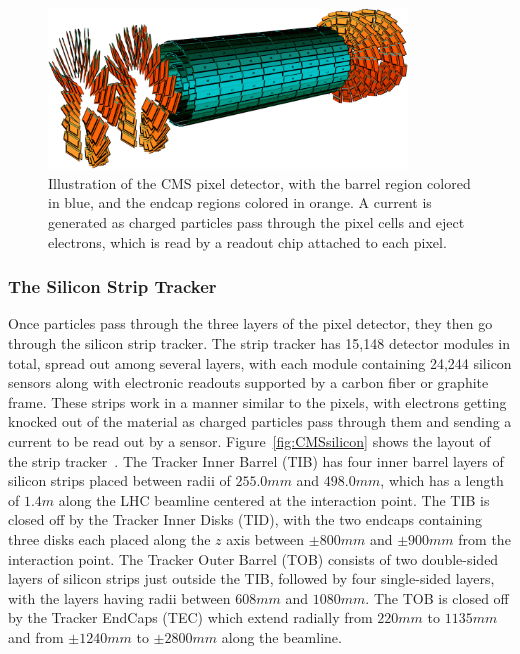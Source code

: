\begin{figure}[htbp]
  \centering
  \includegraphics[width=0.85\textwidth]{fig/experiment/cms_pixelTracker.pdf}
  \caption{
    Illustration of the CMS pixel detector, with the barrel region colored in blue, and the endcap regions colored in orange.
    A current is generated as charged particles pass through the pixel cells and eject electrons, which is read by a readout chip attached to each pixel.
  }
  \label{fig:CMSpixel}
\end{figure}

\subsubsection{The Silicon Strip Tracker}

Once particles pass through the three layers of the pixel detector, they then go through the silicon strip tracker.
The strip tracker has 15,148 detector modules in total, spread out among several layers, with each module containing 24,244 silicon sensors along with electronic readouts supported by a carbon fiber or graphite frame. %
These strips work in a manner similar to the pixels, with electrons getting knocked out of the material as charged particles pass through them and sending a current to be read out by a sensor.
Figure~\ref{fig:CMSsilicon} shows the layout of the strip tracker~\cite{Chatrchyan:1211825}.
The Tracker Inner Barrel (TIB) has four inner barrel layers of silicon strips placed between radii of $255.0\unit{mm}$ and $498.0\unit{mm}$, which has a length of $1.4\unit{m}$ along the LHC beamline centered at the interaction point.
The TIB is closed off by the Tracker Inner Disks (TID), with the two endcaps containing three disks each placed along the $z$ axis between $\pm800\unit{mm}$ and $\pm900\unit{mm}$ from the interaction point.
The Tracker Outer Barrel (TOB) consists of two double-sided layers of silicon strips just outside the TIB, followed by four single-sided layers, with the layers having radii between $608\unit{mm}$ and $1080\unit{mm}$.
The TOB is closed off by the Tracker EndCaps (TEC) which extend radially from $220\unit{mm}$ to $1135\unit{mm}$ and from $\pm1240\unit{mm}$ to $\pm2800\unit{mm}$ along the beamline.

